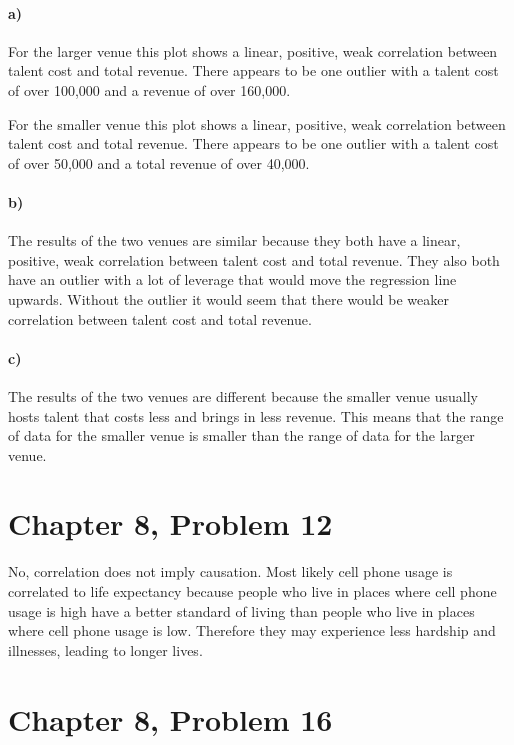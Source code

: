\documentclass[12pt]{article}
\begin{document}
\paragraph{a)}

For the larger venue this plot shows a linear, positive, weak correlation between talent
cost and total revenue. There appears to be one outlier with a talent cost of over 100,000
and a revenue of over 160,000.

For the smaller venue this plot shows a linear, positive, weak correlation between talent cost
and total revenue. There appears to be one outlier with a talent cost of over 50,000 and a
total revenue of over 40,000.

\paragraph{b)}

The results of the two venues are similar because they both have a linear, positive, weak correlation
between talent cost and total revenue. They also both have an outlier with a lot of leverage that would
move the regression line upwards. Without the outlier it would seem that there would be weaker correlation
between talent cost and total revenue.

\paragraph{c)}

The results of the two venues are different because the smaller venue usually hosts talent that costs
less and brings in less revenue. This means that the range of data for the smaller venue is smaller
than the range of data for the larger venue.

\section*{Chapter 8, Problem 12}

No, correlation does not imply causation. Most likely cell phone usage is correlated
to life expectancy because people who live in places where cell phone usage is high
have a better standard of living than people who live in places where cell phone usage
is low. Therefore they may experience less hardship and illnesses, leading to longer lives.

\section*{Chapter 8, Problem 16}
\end{document}
